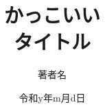 \documentclass[11pt,oneside]{jbook}
\begin{document}
\title{%
かっこいい\\
タイトル
}


\author{著者名}

\date{令和y年m月d日}





\maketitle


\begin{abstract}

\end{abstract}

\begin{acknowledgments}

\end{acknowledgments}


\tableofcontents       %

%
%

\listoffigures         %
\listoftables          %


\cleardoublepage
{}  %
%
%
%







%
%



\appendix

\end{document}
